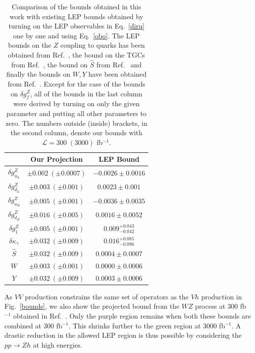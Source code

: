 \documentclass[../report.tex]{subfiles}
\begin{document}
\begin{table}[t]
\begin{center}

\begin{tabular}{c|c|c}%
&Our Projection &LEP Bound\\\hline
$\delta g^Z_{u_L}$         & $\pm0.002~(\pm0.0007)$ & $-0.0026\pm 0.0016$\\
$\delta g^Z_{d_L}$         & $\pm0.003~(\pm0.001)$  & $0.0023\pm 0.001$\\
$\delta g^Z_{u_R}$         & $\pm0.005~(\pm0.001)$  & $-0.0036\pm 0.0035$\\
$\delta g^Z_{d_R}$         & $\pm0.016~(\pm0.005)$  & $0.0016\pm 0.0052$\\
$\delta g^Z_1$             & $\pm0.005~(\pm0.001)$  & $0.009^{+0.043}_{-0.042}$\\
$\delta \kappa_\gamma$     & $\pm0.032~(\pm0.009)$  & $0.016^{+0.085}_{-0.096}$\\
$\hat{S}$                  & $\pm0.032~(\pm0.009)$ & $0.0004 \pm 0.0007$\\
$W$                        & $\pm0.003~(\pm0.001)$  & $0.0000 \pm 0.0006$\\
$Y$                        & $\pm0.032~(\pm0.009)$  & $0.0003\pm 0.0006$
 \end{tabular}
  \caption{Comparison of the bounds obtained in this work with existing LEP bounds obtained by turning on the LEP observables in Eq.~\ref{diru} one by one and using Eq.~\ref{obo}. The LEP bounds on the $Z$ coupling to quarks has been obtained from Ref.~\cite{Falkowski:2014tna}, the bound on the TGCs from Ref.~\cite{LEP2}, the bound on $\hat{S}$ from Ref.~\cite{Baak:2012kk} and  finally the bounds on $W,Y$ have been obtained from Ref.~\cite{Barbieri:2004qk}. Except for the case of the bounds on $\delta g^Z_f$, all of the bounds in the last column were derived by turning on only the given parameter and putting all other parameters  to zero. The numbers outside (inside) brackets, 
  in the second column, denote our bounds with $\mathcal{L} = 300 \; (3000)$ fb$^{-1}$.  \label{lepb}}
\end{center}
\end{table}

As $VV$ production constrains the same set of operators as the $Vh$ 
production in Fig.~\ref{bounds}, we also show the projected bound from the $WZ$ process at 300 
fb$^{-1}$ obtained in Ref.~\cite{Franceschini:2017xkh}. Only the 
purple region remains when both these bounds are combined  at 300 fb$^{-1}$. This shrinks further to the green region  at 3000 fb$^{-1}$. A drastic reduction in the allowed LEP region is   thus possible by considering the $pp \to Zh$ at high energies.
\end{document}
